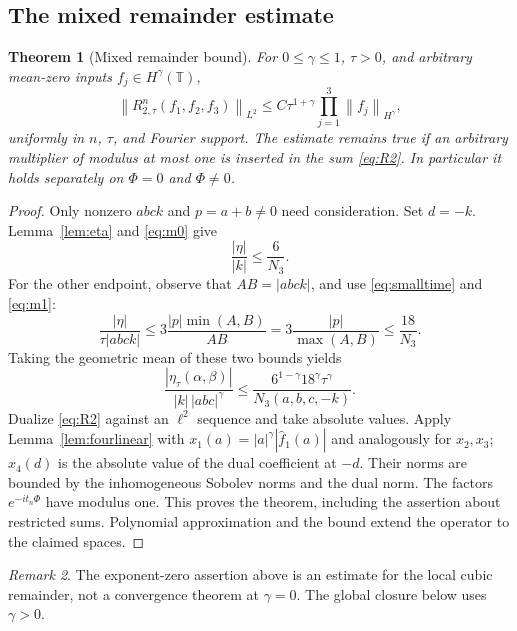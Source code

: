 \documentclass[11pt]{article}
\newtheorem{theorem}{Theorem}
\theoremstyle{remark}\newtheorem{remark}[theorem]{Remark}
\newcommand{\T}{\mathbb T}
\newcommand{\norm}[2][]{\left\lVert #2\right\rVert_{#1}}
\newcommand{\abs}[1]{\left|#1\right|}
\begin{document}
\subsection{The mixed remainder estimate}
\begin{theorem}[Mixed remainder bound]\label{thm:local}
For $0\leq\gamma\leq1$, $\tau>0$, and arbitrary mean-zero inputs
$f_j\in H^\gamma(\T)$,
\begin{equation}\label{eq:local}
\norm[L^2]{R_{2,\tau}^{n}(f_1,f_2,f_3)}
\leq C\tau^{1+\gamma}\prod_{j=1}^3\norm[H^\gamma]{f_j},
\end{equation}
uniformly in $n$, $\tau$, and Fourier support. The estimate remains true
if an arbitrary multiplier of modulus at most one is inserted in the sum
\eqref{eq:R2}. In particular it holds separately on $\Phi=0$ and $\Phi\ne0$.
\end{theorem}
\begin{proof}
Only nonzero $abck$ and $p=a+b\ne0$ need consideration. Set $d=-k$.
Lemma~\ref{lem:eta} and \eqref{eq:m0} give
\[
\frac{\abs\eta}{\abs k}\leq\frac6{N_3}.
\]
For the other endpoint, observe that $AB=\abs{abck}$, and use
\eqref{eq:smalltime} and \eqref{eq:m1}:
\[
\frac{\abs\eta}{\tau\abs{abck}}
\leq3\frac{\abs p\min(A,B)}{AB}
=3\frac{\abs p}{\max(A,B)}\leq\frac{18}{N_3}.
\]
Taking the geometric mean of these two bounds yields
\begin{equation}\label{eq:central}
\boxed{\quad
\frac{\abs{\eta_\tau(\alpha,\beta)}}{\abs k\,\abs{abc}^{\gamma}}
\leq\frac{6^{1-\gamma}18^\gamma\tau^\gamma}{N_3(a,b,c,-k)}.
\quad}
\end{equation}
Dualize \eqref{eq:R2} against an $\ell^2$ sequence and take absolute values.
Apply Lemma~\ref{lem:fourlinear} with
$x_1(a)=\abs a^\gamma\abs{\widehat f_1(a)}$ and analogously for $x_2,x_3$;
$x_4(d)$ is the absolute value of the dual coefficient at $-d$.
Their norms are bounded by the inhomogeneous Sobolev norms and the dual norm.
The factors $e^{-it_n\Phi}$ have modulus one. This proves the theorem,
including the assertion about restricted sums. Polynomial approximation
and the bound extend the operator to the claimed spaces.
\end{proof}

\begin{remark}
The exponent-zero assertion above is an estimate for the local cubic remainder,
not a convergence theorem at $\gamma=0$. The global closure below uses $\gamma>0$.
\end{remark}
\end{document}
